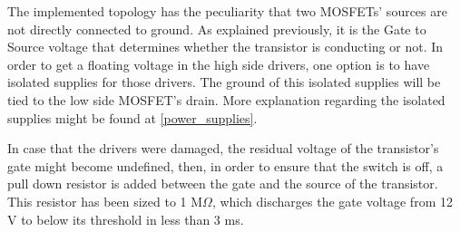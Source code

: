 The implemented topology has the peculiarity that two MOSFETs' sources are not directly connected to ground. As explained previously, it is the Gate to Source voltage that determines whether the transistor is conducting or not. In order to get a floating voltage in the high side drivers, one option is to have isolated supplies for those drivers. The ground of this isolated supplies will be tied to the low side MOSFET's drain. More explanation regarding the isolated supplies might be found at \ref{power_supplies}.

In case that the drivers were damaged, the residual voltage of the transistor's gate might become undefined, then, in order to ensure that the switch is off, a pull down resistor is added between the gate and the source of the transistor. This resistor has been sized to 1 M$\Omega$, which discharges the gate voltage from 12 V to below its threshold in less than 3 ms.
